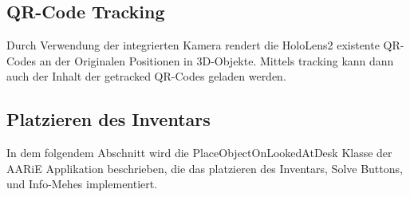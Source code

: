 \subsection{QR-Code Tracking}
Durch Verwendung der integrierten Kamera rendert die HoloLens2 existente QR-Codes an
der Originalen Positionen in 3D-Objekte. Mittels tracking kann dann auch der Inhalt
der getracked QR-Codes geladen werden.

\subsection{Platzieren des Inventars}
In dem folgendem Abschnitt wird die PlaceObjectOnLookedAtDesk Klasse der AARiE Applikation beschrieben, die das platzieren des Inventars,
Solve Buttons, und Info-Mehes implementiert.

